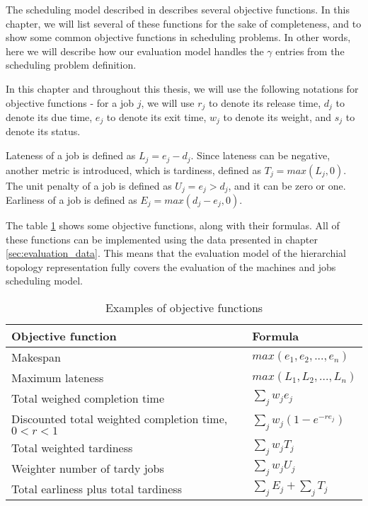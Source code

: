 The scheduling model described in \citep{pinedo2016scheduling} describes several objective functions. In this chapter, we will list several of these functions for the sake of completeness, and to show some common objective functions in scheduling problems. In other words, here we will describe how our evaluation model handles the $ \gamma $ entries from the scheduling problem definition.

In this chapter and throughout this thesis, we will use the following notations for objective functions - for a job $j$, we will use $r_j$ to denote its release time, $d_j$ to denote its due time, $e_j$ to denote its exit time, $w_j$ to denote its weight, and $s_j$ to denote its status.

Lateness of a job is defined as $L_j = e_j - d_j$. Since lateness can be negative, another metric is introduced, which is tardiness, defined as $T_j = max(L_j, 0)$. The unit penalty of a job is defined as $U_j = e_j > d_j$, and it can be zero or one. Earliness of a job is defined as $E_j = max(d_j - e_j, 0)$.

The table \ref{tab:objective_functions_table} shows some objective functions, along with their formulas. All of these functions can be implemented using the data presented in chapter \ref{sec:evaluation_data}. This means that the evaluation model of the hierarchial topology representation fully covers the evaluation of the machines and jobs scheduling model.

\begin{table}[!htbp]
    \begin{center}
        \begin{tabular}{|l|l|} 
         \hline
         Objective function & Formula \\ [0.5ex] 
         \hline\hline
         Makespan & $ max(e_1, e_2, ..., e_n) $ \\ 
         \hline
         Maximum lateness & $  max(L_1, L_2, ..., L_n) $ \\ 
         \hline
         Total weighed completion time & $ \sum_{j} w_j e_j $ \\ 
         \hline
         Discounted total weighted completion time, $ 0 < r < 1$ & $ \sum_{j} w_j (1 - e^{-r e_j}) $ \\ 
         \hline
         Total weighted tardiness & $ \sum_{j} w_j T_j $ \\ 
         \hline
         Weighter number of tardy jobs & $ \sum_{j} w_j U_j $ \\ 
         \hline
         Total earliness plus total tardiness & $ \sum_{j} E_j + \sum_{j} T_j $ \\ 
         \hline
        \end{tabular}
        \end{center}
        \caption{Examples of objective functions}
    \label{tab:objective_functions_table}
    \end{table}

